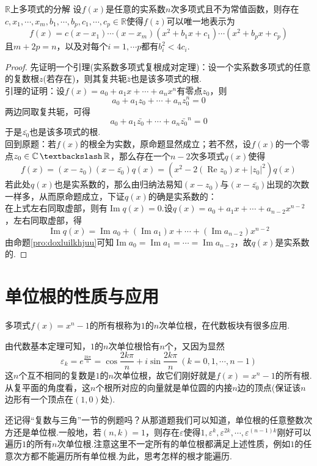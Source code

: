 \documentclass[lang=cn, zihao=5]{elegantbook}
\newcommand{\R}{\mathbb{R}}
\newcommand{\C}{\mathbb{C}}
\DeclareMathOperator{\setjianfa}{\textbackslash}
\DeclareMathOperator{\CRe}{Re}
\DeclareMathOperator{\CIm}{Im}
\begin{document}
\begin{proposition}{$\R$上多项式的分解}
	设$f(x)$是任意的实系数$n$次多项式且不为常值函数，则存在$c,x_1, \cdots ,x_m,b_1, \cdots ,b_p,c_1,\cdots ,c_p \in \R$使得$f(z)$可以唯一地表示为$$f(x) = c(x-x_1) \cdots (x-x_m)(x^2+b_1x+c_1) \cdots (x^2+b_px+c_p)$$
	且$m+2p=n$，以及对每个$i=1, \cdots p$都有$b_i^2 < 4c_i$.
\end{proposition}
\begin{proof}
	先证明一个引理(实系数多项式复根成对定理)：设一个实系数多项式的任意的复数根$z$(若存在)，则其复共轭$\bar{z}$也是该多项式的根. \\
	引理的证明：设$f(x)=a_0+a_1x+ \cdots +a_nx^n$有零点$z_0$，则$$a_0+a_1z_0+ \cdots +a_nz_0^n = 0$$
	两边同取复共轭，可得$$a_0+a_1\bar{z_0}+ \cdots +a_n\bar{z_0}^n = 0$$
	于是$\bar{z_0}$也是该多项式的根. \\
	回到原题：若$f(x)$的根全为实数，原命题显然成立；若不然，设$f(x)$的一个零点$z_0 \in \C \setjianfa \R$，那么存在一个$n-2$次多项式$q(x)$使得$$f(x)=(x-z_0)(x-\bar{z_0})q(x) = (x^2-2(\CRe z_0)x+|z_0|^2)q(x)$$
	若此处$q(x)$也是实系数的，那么由归纳法易知$(x-z_0)$与$(x-\bar{z_0})$出现的次数一样多，从而原命题成立，下证$q(x)$的确是实系数的： \\
	在上式左右同取虚部，则有$\CIm q(x) = 0$.设$q(x)=a_0 + a_1x + \cdots + a_{n-2}x^{n-2}$，左右同取虚部，得$$\CIm q(x) = \CIm a_0 + (\CIm a_1)x + \cdots + (\CIm a_{n-2})x^{n-2}$$
	由命题\ref{pro:doxluilkhjuu}可知$\CIm a_0 = \CIm a_1 = \cdots = \CIm a_{n-2}$，故$q(x)$是实系数的.
\end{proof}

\section{单位根的性质与应用}

多项式$f(x)=x^n-1$的所有根称为$1$的$n$次单位根，在代数板块有很多应用.

由代数基本定理可知，$1$的$n$次单位根恰有$n$个，又因为显然$$\varepsilon _k = e^{\frac{2k\pi }{n}} = \cos \frac{2k\pi }{n} + i \sin \frac{2k\pi }{n} ~(k=0,1,\cdots ,n-1)$$
这$n$个互不相同的复数是$1$的$n$次单位根，故它们刚好就是$f(x)=x^n-1$的所有根.从复平面的角度看，这$n$个根所对应的向量就是单位圆的内接$n$边的顶点(保证该$n$边形有一个顶点在$(1,0)$处).

还记得“复数与三角”一节的例题吗？从那道题我们可以知道，单位根的任意整数次方还是单位根.一般地，若$(n,k)=1$，则存在$\varepsilon$使得$1,\varepsilon ^k,\varepsilon ^{2k},\cdots ,\varepsilon ^{(n-1)k}$刚好可以遍历$1$的所有$n$次单位根.注意这里不一定所有的单位根都满足上述性质，例如$1$的任意次方都不能遍历所有单位根.为此，思考怎样的根才能遍历.
\end{document}
